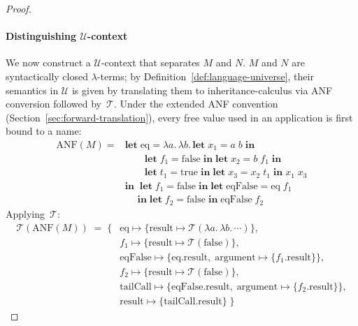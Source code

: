 \begin{proof}
  \paragraph{Distinguishing $\mathscr{U}$-context}
  We now construct a $\mathscr{U}$-context that
  separates $M$ and $N$.
  $M$ and $N$ are syntactically closed $\lambda$-terms;
  by Definition~\ref{def:language-universe}, their
  semantics in $\mathscr{U}$ is given by translating
  them to inheritance-calculus via ANF conversion followed
  by~$\mathcal{T}$.
  Under the extended ANF convention
  (Section~\ref{sec:forward-translation}), every free
  value used in an application is first bound to a name:
  \begin{align*}
    \mathrm{ANF}(M) ={} &
    \mathbf{let}\;\mathrm{eq} =
    \lambda a.\,\lambda b.\,
    \mathbf{let}\; x_1 = a\;b \;\mathbf{in}\; \\
    &\qquad
    \mathbf{let}\; f_1 = \mathrm{false}
    \;\mathbf{in}\;
    \mathbf{let}\; x_2 = b\;f_1 \;\mathbf{in}\; \\
    &\qquad
    \mathbf{let}\; t_1 = \mathrm{true}
    \;\mathbf{in}\;
    \mathbf{let}\; x_3 = x_2\;t_1
    \;\mathbf{in}\;
    x_1\;x_3 \\
    & \mathbf{in}\;\;
    \mathbf{let}\; f_1 = \mathrm{false}
    \;\mathbf{in}\;
    \mathbf{let}\;\mathrm{eqFalse} = \mathrm{eq}\;f_1 \\
    &\quad
    \;\mathbf{in}\;
    \mathbf{let}\; f_2 = \mathrm{false}
    \;\mathbf{in}\;
    \mathrm{eqFalse}\;f_2
  \end{align*}
  Applying~$\mathcal{T}$:
  \begin{align*}
    \mathcal{T}(\mathrm{ANF}(M)) \;=\; \{&
      \mathrm{eq} \mapsto \{\mathrm{result} \mapsto
      \mathcal{T}(\lambda a.\,\lambda b.\,\cdots)\}, \\
      & f_1 \mapsto \{\mathrm{result} \mapsto
      \mathcal{T}(\mathrm{false})\}, \\
      & \mathrm{eqFalse} \mapsto
      \{\mathrm{eq}.\mathrm{result},\;
        \mathrm{argument} \mapsto
      \{f_1.\mathrm{result}\}\}, \\
      & f_2 \mapsto \{\mathrm{result} \mapsto
      \mathcal{T}(\mathrm{false})\}, \\
      & \mathrm{tailCall} \mapsto
      \{\mathrm{eqFalse}.\mathrm{result},\;
        \mathrm{argument} \mapsto
      \{f_2.\mathrm{result}\}\}, \\
      & \mathrm{result} \mapsto
      \{\mathrm{tailCall}.\mathrm{result}\}
    \;\}
  \end{align*}

\end{proof}
